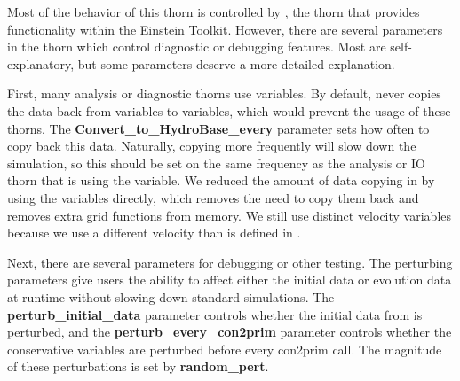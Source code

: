 \documentclass{article}
\begin{document}
Most of the behavior of this thorn is controlled by \glib,
the thorn that provides \grhayl{} functionality
within the Einstein Toolkit. However, there are several
parameters in the thorn which control diagnostic or debugging
features. Most are self-explanatory, but some parameters deserve
a more detailed explanation.

First, many analysis or diagnostic thorns use \hydrobase{} variables.
By default, \ghd{} never copies the data back from \ghd{} variables
to \hydrobase{} variables, which would prevent the usage of these
thorns. The \textbf{Convert\_to\_HydroBase\_every} parameter
sets how often to copy back this data. Naturally, copying more
frequently will slow down the simulation, so this should be set
on the same frequency as the analysis or IO thorn that is using
the \hydrobase{} variable. We reduced the amount of data copying in \ghd{}
by using the \hydrobase{} variables directly, which removes the need
to copy them back and removes extra grid functions from memory.
We still use distinct velocity variables because we use a different
velocity than is defined in \hydrobase.

Next, there are several parameters for debugging or other testing.
The perturbing parameters give users the ability to affect either
the initial data or evolution data at runtime without slowing down
standard simulations. The \textbf{perturb\_initial\_data} parameter
controls whether the initial data from \hydrobase{} is perturbed, and
the \textbf{perturb\_every\_con2prim} parameter controls whether
the conservative variables are perturbed before every con2prim call.
The magnitude of these perturbations is set by \textbf{random\_pert}.

\end{document}
